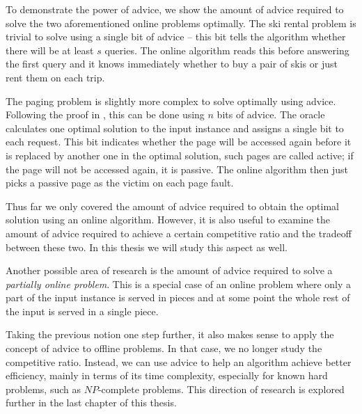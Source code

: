 To demonstrate the power of advice, we show the amount of advice required
to solve the two aforementioned online problems optimally. The ski rental
problem is trivial to solve using a single bit of advice -- this bit tells
the algorithm whether there will be at least $s$ queries. The online
algorithm reads this before answering the first query and it knows
immediately whether to buy a pair of skis or just rent them on each trip.

The paging problem is slightly more complex to solve optimally using
advice. Following the proof in \cite{paging-optimal}, this can be done
using $n$ bits of advice. The oracle calculates one optimal solution to
the input instance and assigns a single bit to each request. This bit
indicates whether the page will be accessed again before it is replaced by
another one in the optimal solution, such pages are called active; if the
page will not be accessed again, it is passive. The online algorithm then
just picks a passive page as the victim on each page fault.

Thus far we only covered the amount of advice required to obtain the
optimal solution using an online algorithm. However, it is also useful to
examine the amount of advice required to achieve a certain competitive
ratio and the tradeoff between these two. In this thesis we will study
this aspect as well.

Another possible area of research is the amount of advice required to
solve a \emph{partially online problem}. This is a special case of an
online problem where only a part of the input instance is served in pieces
and at some point the whole rest of the input is served in a single piece.

Taking the previous notion one step further, it also makes sense to apply
the concept of advice to offline problems. In that case, we no longer
study the competitive ratio. Instead, we can use advice to help an
algorithm achieve better efficiency, mainly in terms of its time
complexity, especially for known hard problems, such as $NP$-complete
problems. This direction of research is explored further in the last
chapter of this thesis.
